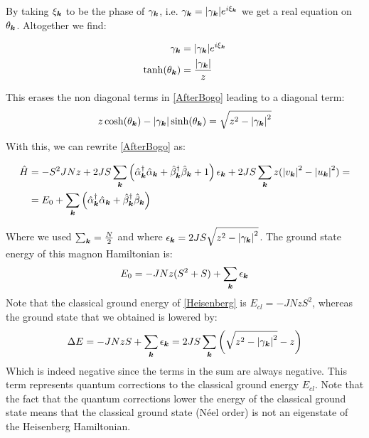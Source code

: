 By taking $\xi_{\boldsymbol{k}}$ to be the phase of $\gamma_{\boldsymbol{k}}$, i.e. $\gamma_{\boldsymbol{k}} = \abs{\gamma_{\boldsymbol{k}}} e^{i\xi_{\boldsymbol{k}}}$ we get a real equation on $\theta_{\boldsymbol{k}}$. Altogether we find:

\begin{align}
\gamma_{\boldsymbol{k}} &= \abs{\gamma_{\boldsymbol{k}}} e^{i\xi_{\boldsymbol{k}}} \\
\tanh(\theta_{\boldsymbol{k}}) &= \frac{\abs{\gamma_{\boldsymbol{k}}}}{z}
\end{align}

This erases the non diagonal terms in \ref{AfterBogo} leading to a diagonal term:
\begin{equation}
z\cosh(\theta_{\boldsymbol{k}})-\abs{\gamma_{\boldsymbol{k}}}\sinh(\theta_{\boldsymbol{k}}) = \sqrt{z^2-\abs{\gamma_{\boldsymbol{k}}}^2}
\end{equation}

With this, we can rewrite \ref{AfterBogo} as:

\begin{align}
\hat{H} &= -S^2JNz + 2JS \sum_{\boldsymbol{k}}\left( \hat{\alpha}_{\boldsymbol{k}}^\dagger \hat{\alpha}_{\boldsymbol{k}} +\hat{\beta}_{\boldsymbol{k}}^\dagger \hat{\beta}_{\boldsymbol{k}}+1 \right)\epsilon_{\boldsymbol{k}}+2JS \sum_{\boldsymbol{k}}z(\abs{v_{\boldsymbol{k}}}^2-\abs{u_{\boldsymbol{k}}}^2) = \nonumber \\
&= E_0 + \sum_{\boldsymbol{k}}\left( \hat{\alpha}_{\boldsymbol{k}}^\dagger \hat{\alpha}_{\boldsymbol{k}} +\hat{\beta}_{\boldsymbol{k}}^\dagger \hat{\beta}_{\boldsymbol{k}} \right)
\end{align}

Where we used $\sum_{\boldsymbol{k}}=\frac{N}{2}$ and where $\epsilon_{\boldsymbol{k}} = 2JS \sqrt{z^2-\abs{\gamma_{\boldsymbol{k}}}^2}$. The ground state energy of this magnon Hamiltonian is:
\begin{equation}
E_0 = -JNz(S^2+S)+\sum_{\boldsymbol{k}}\epsilon_{\boldsymbol{k}} \label{HeisenbergMagnonGS}
\end{equation}
Note that the classical ground energy of \ref{Heisenberg} is $E_{cl}=-JNzS^2$, whereas the ground state that we obtained is lowered by:
\begin{equation}
\Delta E=-JNzS+\sum_{\boldsymbol{k}}\epsilon_{\boldsymbol{k}} = 2JS\sum_{\boldsymbol{k}}\left( \sqrt{z^2-\abs{\gamma_{\boldsymbol{k}}}^2} - z\right)
\end{equation}
Which is indeed negative since the terms in the sum are always negative. This term represents quantum corrections to the classical ground energy $E_{cl}$. Note that the fact that the quantum corrections lower the energy of the classical ground state means that the classical ground state (N\'eel order) is not an eigenstate of the Heisenberg Hamiltonian.

